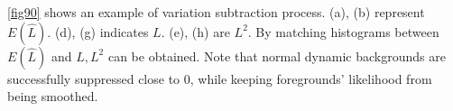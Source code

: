 \documentclass[a4paper,twocolumn, 10pt]{article}
\begin{document}
\ref{fig90} shows an example of variation subtraction process. (a), (b) represent \begin{math} E(\hat{L}) \end{math}.
(d), (g) indicates \begin{math} L \end{math}. (e), (h) are \begin{math} L^2 \end{math}.
By matching histograms between \begin{math} E(\hat{L}) \end{math} and \begin{math} L, L^2 \end{math} can be obtained.
Note that normal dynamic backgrounds are successfully suppressed close to 0, while keeping foregrounds' likelihood from being smoothed.
\end{document}
